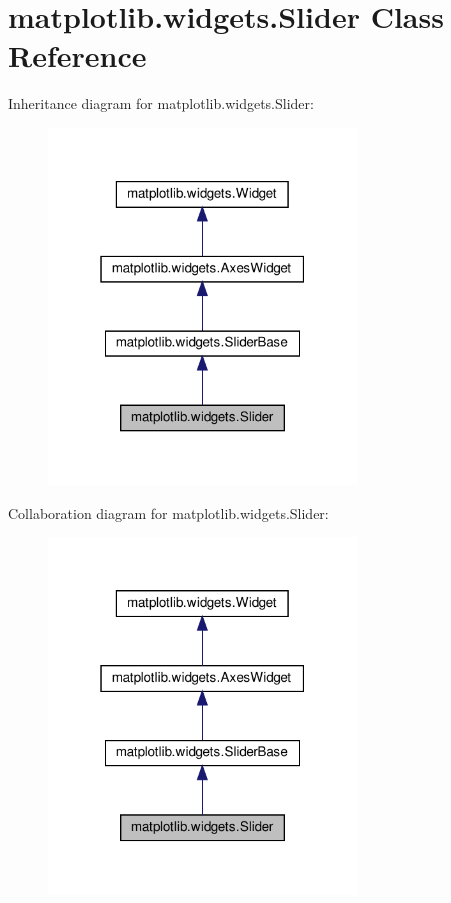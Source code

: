 \hypertarget{classmatplotlib_1_1widgets_1_1Slider}{}\section{matplotlib.\+widgets.\+Slider Class Reference}
\label{classmatplotlib_1_1widgets_1_1Slider}


Inheritance diagram for matplotlib.\+widgets.\+Slider\+:
\nopagebreak
\begin{figure}[H]
\begin{center}
\leavevmode
\includegraphics[width=232pt]{classmatplotlib_1_1widgets_1_1Slider__inherit__graph}
\end{center}
\end{figure}


Collaboration diagram for matplotlib.\+widgets.\+Slider\+:
\nopagebreak
\begin{figure}[H]
\begin{center}
\leavevmode
\includegraphics[width=232pt]{classmatplotlib_1_1widgets_1_1Slider__coll__graph}
\end{center}
\end{figure}
